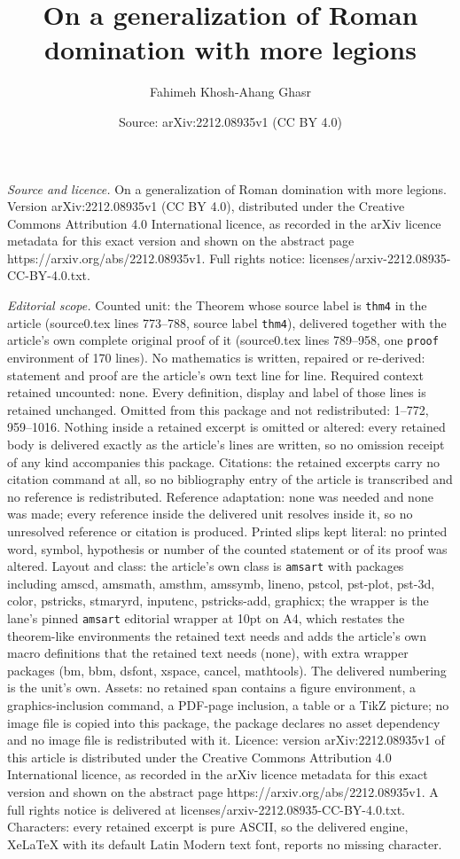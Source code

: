 \documentclass[10pt,a4paper]{amsart}
\title[On a generalization of Roman domination with more legions]{On a generalization of Roman domination with more legions}
\author{Fahimeh Khosh-Ahang Ghasr}
\date{Source: arXiv:2212.08935v1 (CC BY 4.0)}
\begin{document}
\maketitle

\noindent\emph{Source and licence.} On a generalization of Roman domination with more legions. Version arXiv:2212.08935v1 (CC BY 4.0), distributed under the Creative Commons Attribution 4.0 International licence, as recorded in the arXiv licence metadata for this exact version and shown on the abstract page https://arxiv.org/abs/2212.08935v1. Full rights notice: licenses/arxiv-2212.08935-CC-BY-4.0.txt.\par\smallskip

\noindent\textit{Editorial scope.} Counted unit: the Theorem whose source label is \texttt{thm4} in the article (source0.tex lines 773--788, source label \texttt{thm4}), delivered together with the article's own complete original proof of it (source0.tex lines 789--958, one \texttt{proof} environment of 170 lines). No mathematics is written, repaired or re-derived: statement and proof are the article's own text line for line. Required context retained uncounted: none. Every definition, display and label of those lines is retained unchanged. Omitted from this package and not redistributed: 1--772, 959--1016. Nothing inside a retained excerpt is omitted or altered: every retained body is delivered exactly as the article's lines are written, so no omission receipt of any kind accompanies this package. Citations: the retained excerpts carry no citation command at all, so no bibliography entry of the article is transcribed and no reference is redistributed. Reference adaptation: none was needed and none was made; every reference inside the delivered unit resolves inside it, so no unresolved reference or citation is produced. Printed slips kept literal: no printed word, symbol, hypothesis or number of the counted statement or of its proof was altered. Layout and class: the article's own class is \texttt{amsart} with packages including amscd, amsmath, amsthm, amssymb, lineno, pstcol, pst-plot, pst-3d, color, pstricks, stmaryrd, inputenc, pstricks-add, graphicx; the wrapper is the lane's pinned \texttt{amsart} editorial wrapper at 10pt on A4, which restates the theorem-like environments the retained text needs and adds the article's own macro definitions that the retained text needs (none), with extra wrapper packages (bm, bbm, dsfont, xspace, cancel, mathtools). The delivered numbering is the unit's own. Assets: no retained span contains a figure environment, a graphics-inclusion command, a PDF-page inclusion, a table or a TikZ picture; no image file is copied into this package, the package declares no asset dependency and no image file is redistributed with it. Licence: version arXiv:2212.08935v1 of this article is distributed under the Creative Commons Attribution 4.0 International licence, as recorded in the arXiv licence metadata for this exact version and shown on the abstract page https://arxiv.org/abs/2212.08935v1. A full rights notice is delivered at licenses/arxiv-2212.08935-CC-BY-4.0.txt. Characters: every retained excerpt is pure ASCII, so the delivered engine, XeLaTeX with its default Latin Modern text font, reports no missing character.
\end{document}

